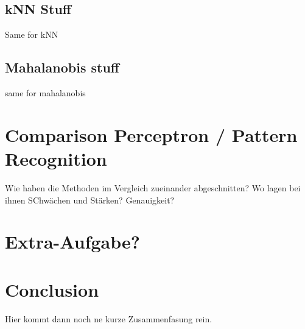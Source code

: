 \documentclass{article}
\begin{document}
\subsection{kNN Stuff}

Same for kNN

\subsection{Mahalanobis stuff}

same for mahalanobis

\section{Comparison Perceptron / Pattern Recognition}

Wie haben die Methoden im Vergleich zueinander abgeschnitten? Wo lagen bei ihnen SChwächen und Stärken? Genauigkeit? 


\section{Extra-Aufgabe?}

\section{Conclusion}

Hier kommt dann noch ne kurze Zusammenfasung rein.
\end{document}
